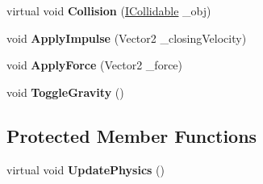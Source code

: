 \begin{DoxyCompactItemize}
\item 
\mbox{\label{class_g_m_t_b_1_1_entities_1_1_physical_entity_aa053042bf8b8f5080d77bef888e30f75}} 
virtual void {\bfseries Collision} (\mbox{\hyperlink{interface_g_m_t_b_1_1_collision_system_1_1_i_collidable}{I\+Collidable}} \+\_\+obj)
\item 
\mbox{\label{class_g_m_t_b_1_1_entities_1_1_physical_entity_ad5d62af7d64dfa5dd47347c9bc6344ad}} 
void {\bfseries Apply\+Impulse} (Vector2 \+\_\+closing\+Velocity)
\item 
\mbox{\label{class_g_m_t_b_1_1_entities_1_1_physical_entity_aef1dd12726500fbfa72640b5a56ed820}} 
void {\bfseries Apply\+Force} (Vector2 \+\_\+force)
\item 
\mbox{\label{class_g_m_t_b_1_1_entities_1_1_physical_entity_a8614447a3094d15c37c4f8c39f2a4e8e}} 
void {\bfseries Toggle\+Gravity} ()
\end{DoxyCompactItemize}
\subsection*{Protected Member Functions}
\begin{DoxyCompactItemize}
\item 
\mbox{\label{class_g_m_t_b_1_1_entities_1_1_physical_entity_a3f4a79aa5675adec8bf3036d05618226}} 
virtual void {\bfseries Update\+Physics} ()
\end{DoxyCompactItemize}
